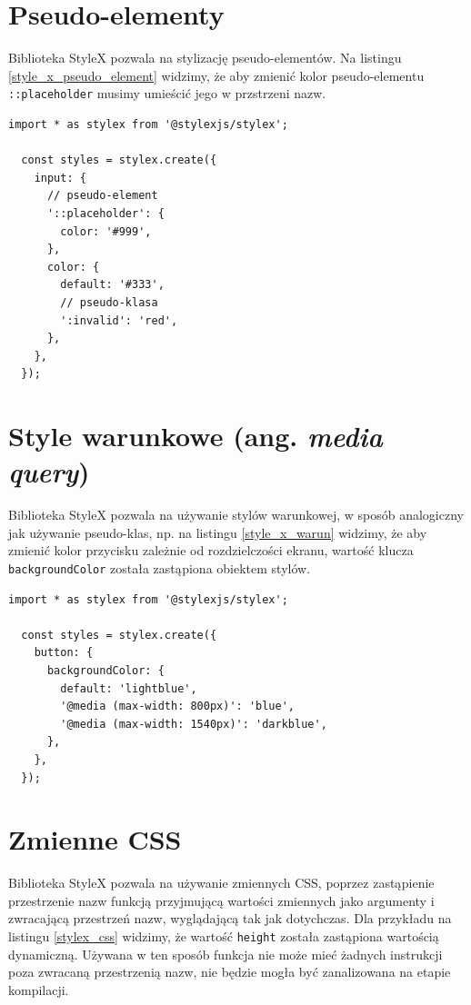 \documentclass[a4paper,12pt]{book} %
\begin{document}
\section{Pseudo-elementy}
Biblioteka StyleX pozwala na stylizację pseudo-elementów. Na listingu \ref{style_x_pseudo_element} widzimy, że aby zmienić kolor pseudo-elementu \lstinline|::placeholder| musimy umieścić jego w przstrzeni nazw.

\begin{lstfloat}[hb]
  \lstset{language=HTML}
  \begin{lstlisting}[frame=single]
  import * as stylex from '@stylexjs/stylex';

  const styles = stylex.create({
    input: {
      // pseudo-element
      '::placeholder': {
        color: '#999',
      },
      color: {
        default: '#333',
        // pseudo-klasa
        ':invalid': 'red',
      },
    },
  });
\end{lstlisting}
  \caption{Przykład stylizacji pseudo-elementu}\label{style_x_pseudo_element}
\end{lstfloat}

\section{Style warunkowe (ang. \emph{media query})}
Biblioteka StyleX pozwala na używanie stylów warunkowej, w sposób analogiczny jak używanie pseudo-klas, np. na listingu \ref{style_x_warun} widzimy, że aby zmienić kolor przycisku zależnie od rozdzielczości ekranu, wartość klucza \lstinline|backgroundColor| została zastąpiona obiektem stylów.

\begin{lstfloat}[hb]
  \lstset{language=HTML}
  \begin{lstlisting}[frame=single]
  import * as stylex from '@stylexjs/stylex';

  const styles = stylex.create({
    button: {
      backgroundColor: {
        default: 'lightblue',
        '@media (max-width: 800px)': 'blue',
        '@media (max-width: 1540px)': 'darkblue',
      },
    },
  });
\end{lstlisting}
  \caption{Przykład wykorzystania stylów warunkowych}\label{style_x_warun}
\end{lstfloat}
\section{Zmienne CSS}
Biblioteka StyleX pozwala na używanie zmiennych CSS, poprzez zastąpienie przestrzenie nazw funkcją przyjmującą wartości zmiennych jako argumenty i\,zwracającą przestrzeń nazw, wyglądającą tak jak dotychczas. Dla przykładu na listingu \ref{stylex_css} widzimy, że wartość \lstinline|height| została zastąpiona wartością dynamiczną. Używana w ten sposób funkcja nie może mieć żadnych instrukcji poza zwracaną przestrzenią nazw, nie będzie mogła być zanalizowana na etapie kompilacji.
\end{document}
